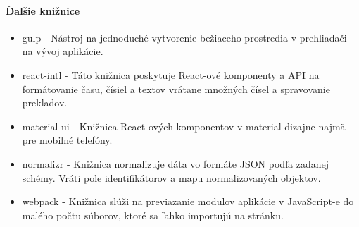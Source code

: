 \paragraph{Ďalšie knižnice}
\begin{itemize}
  \item gulp \cite{gulp} - Nástroj na jednoduché vytvorenie bežiaceho prostredia v prehliadači na vývoj aplikácie.
  \item react-intl \cite{intl} - Táto knižnica poskytuje React-ové komponenty a API na formátovanie času, čísiel a textov vrátane množných čísel a spravovanie prekladov.
  \item material-ui \cite{material-ui} - Knižnica React-ových komponentov v material dizajne najmä pre mobilné telefóny. %
  \item normalizr \cite{normalizr} - Knižnica normalizuje dáta vo formáte JSON podľa zadanej schémy. Vráti pole identifikátorov a mapu normalizovaných objektov.
  \item webpack \cite{webpack} - Knižnica slúži na previazanie modulov aplikácie v JavaScript-e do malého počtu súborov, ktoré sa ľahko importujú na stránku.
\end{itemize}
